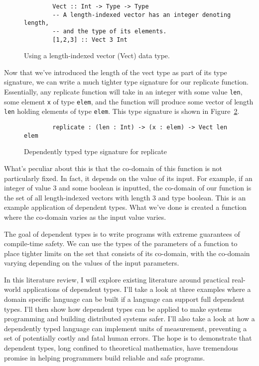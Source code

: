 \begin{figure}[ht!!!]
    \caption{Using a length-indexed vector (Vect) data type.}
    \label{vect}
    \begin{lstlisting}
        Vect :: Int -> Type -> Type 
        -- A length-indexed vector has an integer denoting length, 
        -- and the type of its elements. 
        [1,2,3] :: Vect 3 Int
    \end{lstlisting}
\end{figure} 


Now that we've introduced the length of the vect type as part of its type
signature, we can write a much tighter type signature for our replicate
function. Essentially, any replicate function will take in an integer with some
value \texttt{len}, some element \texttt{x} of type \texttt{elem}, and the
function will produce some vector of length \texttt{len} holding elements of
type \texttt{elem}. This type signature is shown in Figure~\ref{dtvect}. 

\begin{figure}
    \caption{Dependently typed type signature for replicate}
    \label{dtvect}
    \begin{lstlisting}
        replicate : (len : Int) -> (x : elem) -> Vect len elem
    \end{lstlisting}
\end{figure} 

What's peculiar about this is that the co-domain of this function is not
particularly fixed. In fact, it depends on the value of its input. For example,
if an integer of value 3 and some boolean is inputted, the co-domain of our
function is the set of all length-indexed vectors with length 3 and type
boolean. This is an example application of dependent types. What we've done is
created a function where the co-domain varies as the input value varies. 

The goal of dependent types is to write programs with extreme guarantees of
compile-time safety. We can use the types of the parameters of a function to
place tighter limits on the set that consists of its co-domain, with the
co-domain varying depending on the values of the input parameters. 

In this literature review, I will explore existing literature around practical
real-world applications of dependent types. I'll take a look at three examples
where a domain specific language can be built if a language can support full
dependent types. I'll then show how dependent types can be applied to make
systems programming and building distributed systems safer. I'll also take a
look at how a dependently typed language can implement units of measurement,
preventing a set of potentially costly and fatal human errors. The hope is to
demonstrate that dependent types, long confined to theoretical mathematics, have
tremendous promise in helping programmers build reliable and safe programs. 
